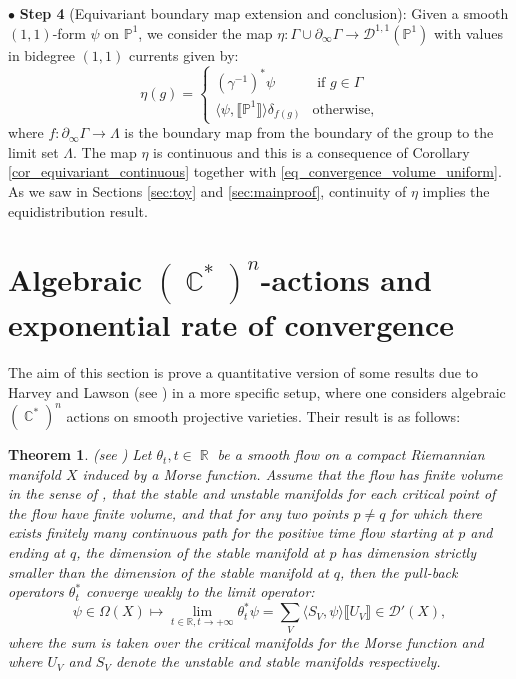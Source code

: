 \documentclass[12pt]{amsbook}%
\newtheorem{thm}{Theorem}[chapter]
\theoremstyle{definition}
\theoremstyle{remark}
\numberwithin{section}{chapter}
\numberwithin{subsection}{section}
\numberwithin{figure}{chapter}
\DeclareMathOperator{\C}{\mathbb{C}}
\DeclareMathOperator{\R}{\mathbb{R}}
\newcommand\intcur[1]{\llbracket #1 \rrbracket}
\def\bR{{\mathbb{R}}}
\def\bP{{\mathbb{P}}}
\begin{document}
{{ $\bullet$ \textbf{Step 4} (Equivariant boundary map extension and conclusion):
Given a smooth $(1,1)$-form $\psi $ on $\bP^1$, we consider the  map $\eta \colon \Gamma \cup \partial_\infty  \Gamma \to \mathcal{D}^{1,1}(\bP^1) $ with values in bidegree $(1,1)$ currents given by: 
\begin{equation}
	\eta( g) = \left \lbrace \begin{array}{ll}
		(\gamma^{-1})^* \psi & \text{ if } g\in \Gamma  \\
		 \langle \psi, \intcur{\bP^1}\rangle  \delta_{f(g)} & \text{otherwise,}
	\end{array} \right .  
\end{equation}   
 where $f \colon \partial_\infty \Gamma \to \Lambda$ is the boundary map from the boundary of the group to the limit set $\Lambda$. 
 The map $\eta$ is continuous and this is a consequence of Corollary \ref{cor_equivariant_continuous} together with \eqref{eq_convergence_volume_uniform}. As we saw in Sections \ref{sec:toy} and \ref{sec:mainproof}, continuity of $\eta$ implies the equidistribution result. 
 
\section{Algebraic $(\C^*)^n$-actions and exponential rate of convergence} \label{section_harvey}


The aim of this section is prove a quantitative version of some results due to Harvey and Lawson (see \cite{harvey_lawson}) in a more specific setup, where one considers algebraic $(\C^*)^n$ actions on smooth projective varieties.  
Their result is as follows:


\begin{thm} (see \cite[Theorem 2.3]{harvey_lawson_survey}) \label{thm_harvey_lawson} Let  $\theta_t,t\in \R$ be a smooth flow on a compact Riemannian manifold $X$ induced by a Morse function. Assume that the flow has finite volume in the sense of \cite[Definition 1.1]{harvey_lawson_survey}, that the stable and unstable manifolds for each critical point of the flow have finite volume, and that for any two points $p \neq q$ for which there exists finitely many continuous path for the positive time flow starting at $p$ and ending at $q$, the dimension of the stable manifold at $p$ has dimension strictly smaller than the dimension of the stable manifold at $q$,
then  the pull-back operators $\theta_t^*$ converge weakly to the limit operator: 
\begin{equation} 
\psi \in \Omega(X) \mapsto \lim_{t\in \bR, t\rightarrow +\infty} \theta_t^* \psi = \sum _{V} \langle S_V , \psi \rangle \intcur{U_V} \in \mathcal{D}'(X),
\end{equation}
where the sum is taken over the critical manifolds for the Morse function and where $U_V$ and $S_V$ denote the unstable and stable manifolds respectively.
\end{thm}

}}
\end{document}
